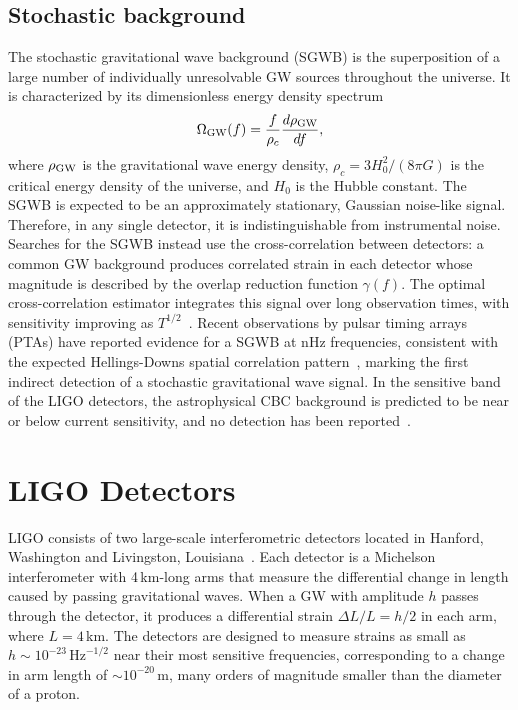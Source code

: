 \begin{refsection}
\subsection{Stochastic background}

The stochastic gravitational wave background (SGWB) is the superposition of a large number of individually unresolvable GW sources throughout the universe.
It is characterized by its dimensionless energy density spectrum
\begin{equation}
    \Omega_{\rm GW}(f) = \frac{f}{\rho_c} \frac{d\rho_{\rm GW}}{df},
\end{equation}
where $\rho_{\rm GW}$ is the gravitational wave energy density, $\rho_c = 3H_0^2 / (8\pi G)$ is the critical energy density of the universe, and $H_0$ is the Hubble constant.
The SGWB is expected to be an approximately stationary, Gaussian noise-like signal.
Therefore, in any single detector, it is indistinguishable from instrumental noise.
Searches for the SGWB instead use the cross-correlation between detectors: a common GW background produces correlated strain in each detector whose magnitude is described by the overlap reduction function $\gamma(f)$.
The optimal cross-correlation estimator integrates this signal over long observation times, with sensitivity improving as $T^{1/2}$~\cite{AlRo1999}.
Recent observations by pulsar timing arrays (PTAs) have reported evidence for a SGWB at nHz frequencies, consistent with the expected Hellings-Downs spatial correlation pattern~\cite{NANOGrav_2023}, marking the first indirect detection of a stochastic gravitational wave signal.
In the sensitive band of the LIGO detectors, the astrophysical CBC background is predicted to be near or below current sensitivity, and no detection has been reported~\cite{o4_stochastic}.

\section{LIGO Detectors}
\label{intro_sec:detectors}

LIGO consists of two large-scale interferometric detectors located in Hanford, Washington and Livingston, Louisiana~\cite{Aasi_2015}.
Each detector is a Michelson interferometer with 4\,km-long arms that measure the differential change in length caused by passing gravitational waves.
When a GW with amplitude $h$ passes through the detector, it produces a differential strain $\Delta L/L = h/2$ in each arm, where $L = 4$\,km.
The detectors are designed to measure strains as small as $h \sim 10^{-23}\,\mathrm{Hz}^{-1/2}$ near their most sensitive frequencies, corresponding to a change in arm length of $\sim 10^{-20}\,\mathrm{m}$, many orders of magnitude smaller than the diameter of a proton.


\end{refsection}
